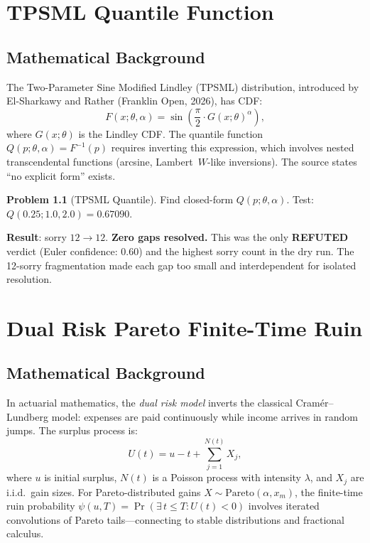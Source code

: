 \documentclass[12pt,a4paper]{report}
\theoremstyle{plain}
\theoremstyle{definition}
\newtheorem{problem}[theorem]{Problem}
\theoremstyle{remark}
\newcommand{\verdict}[1]{\textbf{\textcolor{inkblue}{#1}}}
\begin{document}
\chapter{TPSML Quantile Function}
\label{ch:tpsml}

\section{Mathematical Background}

The Two-Parameter Sine Modified Lindley (TPSML) distribution, introduced by
El-Sharkawy and Rather (Franklin Open, 2026), has CDF:
\[
  F(x; \theta, \alpha) = \sin\!\left(\frac{\pi}{2} \cdot G(x;\theta)^\alpha\right),
\]
where $G(x;\theta)$ is the Lindley CDF. The quantile function $Q(p; \theta, \alpha)
= F^{-1}(p)$ requires inverting this expression, which involves nested transcendental
functions (arcsine, Lambert~$W$-like inversions). The source states ``no explicit form''
exists.

\begin{problem}[TPSML Quantile]
Find closed-form $Q(p; \theta, \alpha)$. Test: $Q(0.25; 1.0, 2.0) = 0.67090$.
\end{problem}

\noindent\textbf{Result}: sorry $12 \to 12$. \textbf{Zero gaps resolved.} This was the
only \verdict{REFUTED} verdict (Euler confidence: 0.60) and the highest sorry count in
the dry run. The 12-sorry fragmentation made each gap too small and interdependent for
isolated resolution.

\chapter{Dual Risk Pareto Finite-Time Ruin}
\label{ch:dual}

\section{Mathematical Background}

In actuarial mathematics, the \emph{dual risk model} inverts the classical
Cramér--Lundberg model: expenses are paid continuously while income arrives in
random jumps. The surplus process is:
\[
  U(t) = u - t + \sum_{j=1}^{N(t)} X_j,
\]
where $u$ is initial surplus, $N(t)$ is a Poisson process with intensity $\lambda$,
and $X_j$ are i.i.d.\ gain sizes. For Pareto-distributed gains
$X \sim \text{Pareto}(\alpha, x_m)$, the finite-time ruin probability
$\psi(u, T) = \Pr(\exists\, t \leq T : U(t) < 0)$ involves iterated convolutions of
Pareto tails—connecting to stable distributions and fractional calculus.
\end{document}
